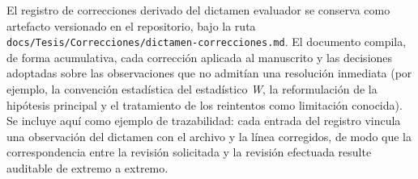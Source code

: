 El registro de correcciones derivado del dictamen evaluador se conserva como artefacto versionado en el repositorio, bajo la ruta \texttt{docs/Tesis/Correcciones/dictamen-correcciones.md}. El documento compila, de forma acumulativa, cada corrección aplicada al manuscrito y las decisiones adoptadas sobre las observaciones que no admitían una resolución inmediata (por ejemplo, la convención estadística del estadístico \emph{W}, la reformulación de la hipótesis principal y el tratamiento de los reintentos como limitación conocida). Se incluye aquí como ejemplo de trazabilidad: cada entrada del registro vincula una observación del dictamen con el archivo y la línea corregidos, de modo que la correspondencia entre la revisión solicitada y la revisión efectuada resulte auditable de extremo a extremo.

\newpage
